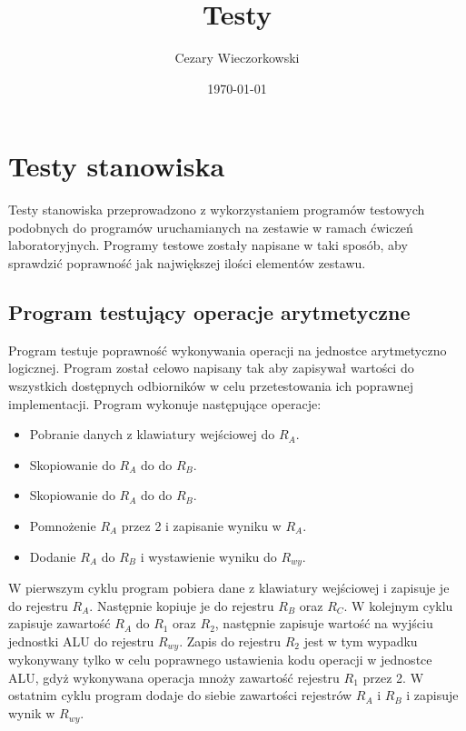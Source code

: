 \documentclass[../main.tex]{subfiles}
\author{Cezary Wieczorkowski}
\date{\today}
\title{Testy}
\begin{document}
\section{Testy stanowiska}

Testy stanowiska przeprowadzono z wykorzystaniem programów testowych podobnych do programów uruchamianych na zestawie w ramach ćwiczeń laboratoryjnych.
Programy testowe zostały napisane w taki sposób, aby sprawdzić poprawność jak największej ilości elementów zestawu.

\subsection{Program testujący operacje arytmetyczne}

    Program testuje poprawność wykonywania operacji na jednostce arytmetyczno logicznej. Program został celowo
    napisany tak aby zapisywał wartości do wszystkich dostępnych odbiorników w celu przetestowania ich poprawnej implementacji. 
    Program wykonuje następujące operacje:

    \begin{itemize}
        \item Pobranie danych z klawiatury wejściowej do $R_A$.
        \item Skopiowanie do $R_A$ do do $R_B$.
        \item Skopiowanie do $R_A$ do do $R_B$.
        \item Pomnożenie $R_A$ przez 2 i zapisanie wyniku w $R_A$.
        \item Dodanie $R_A$ do $R_B$ i wystawienie wyniku do $R_{wy}$.
    \end{itemize}

    W pierwszym cyklu program pobiera dane z klawiatury wejściowej i zapisuje je do rejestru $R_A$. Następnie kopiuje je do 
    rejestru $R_B$ oraz $R_C$. W kolejnym cyklu zapisuje zawartość $R_A$ do $R_1$ oraz $R_2$, następnie zapisuje wartość na wyjściu
    jednostki ALU do rejestru $R_{wy}$. Zapis do rejestru $R_2$ jest w tym wypadku wykonywany tylko w celu poprawnego ustawienia kodu
    operacji w jednostce ALU, gdyż wykonywana operacja mnoży zawartość rejestru $R_1$ przez 2.
    W ostatnim cyklu program dodaje do siebie zawartości rejestrów $R_A$ i $R_B$ i zapisuje wynik w $R_{wy}$.
\end{document}

